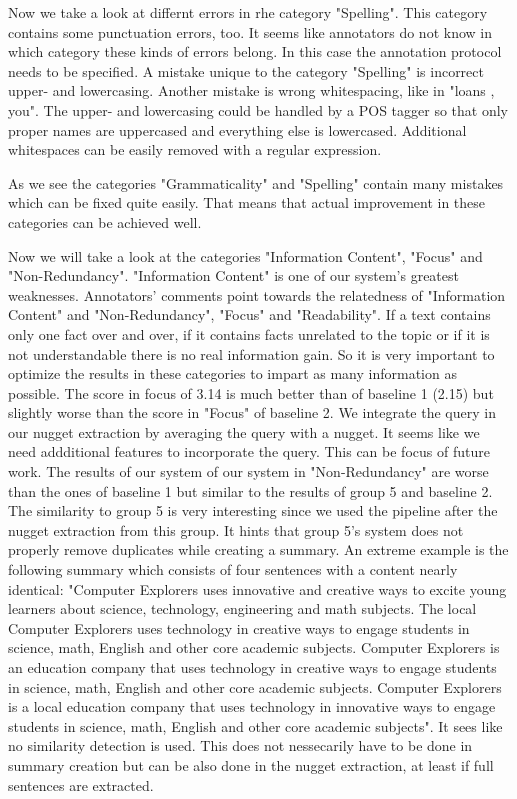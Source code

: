 Now we take a look at differnt errors in rhe category "Spelling". This category contains some punctuation errors, too. It seems like annotators do not know in which category these kinds of errors belong. In this case the annotation protocol needs to be specified. A mistake unique to the category "Spelling" is incorrect upper- and lowercasing. Another mistake is wrong whitespacing, like in "loans , you". The upper- and lowercasing could be handled by a POS tagger so that only proper names are uppercased and everything else is lowercased. Additional whitespaces can be easily removed with a regular expression.

As we see the categories "Grammaticality" and "Spelling" contain many mistakes which can be fixed quite easily. That means that actual improvement in these categories can be achieved well.

Now we will take a look at the categories "Information Content", "Focus" and "Non-Redundancy". "Information Content" is one of our system's greatest weaknesses. Annotators' comments point towards the relatedness of "Information Content" and "Non-Redundancy", "Focus" and "Readability". If a text contains only one fact over and over, if it contains facts unrelated to the topic or if it is not understandable there is no real information gain. So it is very important to optimize the results in these categories to impart as many information as possible. The score in focus of 3.14 is much better than of baseline 1 (2.15) but slightly worse than the score in "Focus" of baseline 2. We integrate the query in our nugget extraction by averaging the query with a nugget. It seems like we need addditional features to incorporate the query. This can be focus of future work. The results of our system of our system in "Non-Redundancy" are worse than the ones of baseline 1 but similar to the results of group 5 and baseline 2. The similarity to group 5 is very interesting since we used the pipeline after the nugget extraction from this group. It hints that group 5's system does not properly remove duplicates while creating a summary. An extreme example is the following summary which consists of four sentences with a content nearly identical: "Computer Explorers uses innovative and creative ways to excite young learners about science, technology, engineering and math subjects. The local Computer Explorers uses technology in creative ways to engage students in science, math, English and other core academic subjects. Computer Explorers is an education company that uses technology in creative ways to engage students in science, math, English and other core academic subjects. Computer Explorers is a local education company that uses technology in innovative ways to engage students in science, math, English and other core academic subjects". It sees like no similarity detection is used. This does not nessecarily have to be done in summary creation but can be also done in the nugget extraction, at least if full sentences are extracted.

